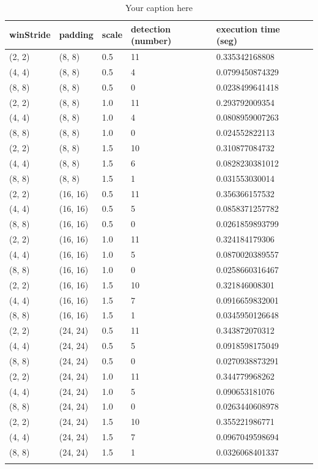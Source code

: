 \begin{longtable}{|l|l|l|l|l|l|} 
	\hline
	\textbf{winStride} & \textbf{padding} & \textbf{scale} & \textbf{detection (number)} & \textbf{execution time (seg)} \\ \hline
	(2, 2) & (8, 8) & 0.5 & 11 & 0.335342168808 \\ \hline
	(4, 4) & (8, 8) & 0.5 & 4 & 0.0799450874329 \\ \hline
	(8, 8) & (8, 8) & 0.5 & 0 & 0.0238499641418 \\ \hline
	(2, 2) & (8, 8) & 1.0 & 11 & 0.293792009354 \\ \hline
	(4, 4) & (8, 8) & 1.0 & 4 & 0.0808959007263 \\ \hline
	(8, 8) & (8, 8) & 1.0 & 0 & 0.024552822113 \\ \hline
	(2, 2) & (8, 8) & 1.5 & 10 & 0.310877084732 \\ \hline
	(4, 4) & (8, 8) & 1.5 & 6 & 0.0828230381012 \\ \hline
	(8, 8) & (8, 8) & 1.5 & 1 & 0.031553030014 \\ \hline
	(2, 2) & (16, 16) & 0.5 & 11 & 0.356366157532 \\ \hline
	(4, 4) & (16, 16) & 0.5 & 5 & 0.0858371257782 \\ \hline
	(8, 8) & (16, 16) & 0.5 & 0 & 0.0261859893799 \\ \hline
	(2, 2) & (16, 16) & 1.0 & 11 & 0.324184179306 \\ \hline
	(4, 4) & (16, 16) & 1.0 & 5 & 0.0870020389557 \\ \hline
	(8, 8) & (16, 16) & 1.0 & 0 & 0.0258660316467 \\ \hline
	(2, 2) & (16, 16) & 1.5 & 10 & 0.321846008301 \\ \hline
	(4, 4) & (16, 16) & 1.5 & 7 & 0.0916659832001 \\ \hline
	(8, 8) & (16, 16) & 1.5 & 1 & 0.0345950126648 \\ \hline
	(2, 2) & (24, 24) & 0.5 & 11 & 0.343872070312 \\ \hline
	(4, 4) & (24, 24) & 0.5 & 5 & 0.0918598175049 \\ \hline
	(8, 8) & (24, 24) & 0.5 & 0 & 0.0270938873291 \\ \hline
	(2, 2) & (24, 24) & 1.0 & 11 & 0.344779968262 \\ \hline
	(4, 4) & (24, 24) & 1.0 & 5 & 0.090653181076 \\ \hline
	(8, 8) & (24, 24) & 1.0 & 0 & 0.0263440608978 \\ \hline
	(2, 2) & (24, 24) & 1.5 & 10 & 0.355221986771 \\ \hline
	(4, 4) & (24, 24) & 1.5 & 7 & 0.0967049598694 \\ \hline
	(8, 8) & (24, 24) & 1.5 & 1 & 0.0326068401337 \\ \hline


	\caption{Your caption here} %
	\label{tab:myfirstlongtable}
\end{longtable}


